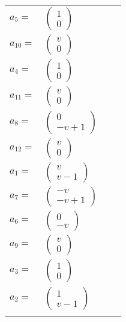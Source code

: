 \documentclass[1p]{elsarticle_modified}
\theoremstyle{definition}
\begin{document}
\begin{tabular}{m{7pt} m{180pt} m{7pt} m{180pt} }
\flushright $a_{5}=$&$\begin{pmatrix}1\\0\end{pmatrix}$ \\
\flushright $a_{10}=$&$\begin{pmatrix}v\\0\end{pmatrix}$ \\
\flushright $a_{4}=$&$\begin{pmatrix}1\\0\end{pmatrix}$ \\
\flushright $a_{11}=$&$\begin{pmatrix}v\\0\end{pmatrix}$ \\
\flushright $a_{8}=$&$\begin{pmatrix}0\\- v+1\end{pmatrix}$ \\
\flushright $a_{12}=$&$\begin{pmatrix}v\\0\end{pmatrix}$ \\
\flushright $a_{1}=$&$\begin{pmatrix}v\\v-1\end{pmatrix}$ \\
\flushright $a_{7}=$&$\begin{pmatrix}- v\\- v+1\end{pmatrix}$ \\
\flushright $a_{6}=$&$\begin{pmatrix}0\\- v\end{pmatrix}$ \\
\flushright $a_{9}=$&$\begin{pmatrix}v\\0\end{pmatrix}$ \\
\flushright $a_{3}=$&$\begin{pmatrix}1\\0\end{pmatrix}$ \\
\flushright $a_{2}=$&$\begin{pmatrix}1\\v-1\end{pmatrix}$\\&\end{tabular}
\end{document}
